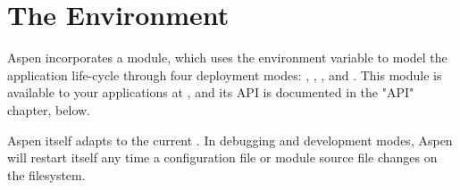 \section{The Environment}
\label{environment}

Aspen incorporates a  module, which uses the 
environment variable to model the application life-cycle through four deployment
modes: , , , and
. This module is available to your applications at
, and its API is documented in the "API" chapter, below.

Aspen itself adapts to the current . In debugging and
development modes, Aspen will restart itself any time a configuration file or
module source file changes on the filesystem.
